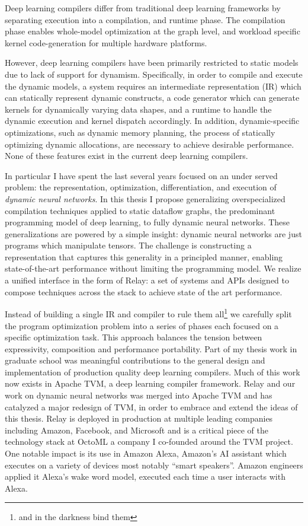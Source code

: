 Deep learning compilers differ from traditional deep learning frameworks by separating execution into a compilation,
  and runtime phase.
The compilation phase enables whole-model optimization at the graph level,
  and workload specific kernel code-generation for multiple hardware platforms.

However, deep learning compilers have been primarily restricted to static models due to lack of support for dynamism.
Specifically, in order to compile and execute the dynamic models, a system requires an intermediate representation (IR) which can statically represent dynamic constructs, a code generator
which can generate kernels for dynamically varying data shapes, and a runtime to handle the dynamic execution and kernel dispatch accordingly.
In addition, dynamic-specific optimizations, such as dynamic memory planning, the process of statically optimizing dynamic allocations, are necessary to achieve desirable performance.
None of these features exist in the current deep learning compilers.

In particular I have spent the last several years focused on an under served problem:
  the representation,
  optimization,
  differentiation,
  and execution of \emph{dynamic neural networks}.
In this thesis I propose generalizing overspecialized
  compilation techniques applied to static dataflow graphs,
  the predominant programming model of deep learning,
  to fully dynamic neural networks.
These generalizations are powered by a simple insight:
  dynamic neural networks are just programs which manipulate tensors.
The challenge is constructing a representation that captures this generality
  in a principled manner, enabling state-of-the-art performance without limiting the programming model.
We realize a unified interface in the form of Relay: a set of systems and APIs designed
  to compose techniques across the stack to achieve state of the art performance.

Instead of building a single IR and compiler to rule them all\footnote{and in the darkness bind them}
  we carefully split the program optimization problem into a series of
  phases each focused on a specific optimization task.
This approach balances the tension between expressivity, composition
  and performance portability.
Part of my thesis work in graduate school
  was meaningful contributions to the general design and implementation of
  production quality deep learning compilers.
Much of this work now exists in Apache TVM, a deep learning compiler framework.
Relay and our work on dynamic neural networks was merged into Apache TVM and
  has catalyzed a major redesign of TVM, in order to embrace and extend the ideas of this thesis.
Relay is deployed in production at multiple leading companies including
  Amazon, Facebook, and Microsoft and is a critical piece of the technology stack
  at OctoML a company I co-founded around the TVM project.
One notable impact is its use in Amazon Alexa, Amazon's AI assistant
  which executes on a variety of devices most notably ``smart speakers''.
Amazon engineers applied it Alexa’s wake word model, executed each time a user interacts with
  Alexa.

